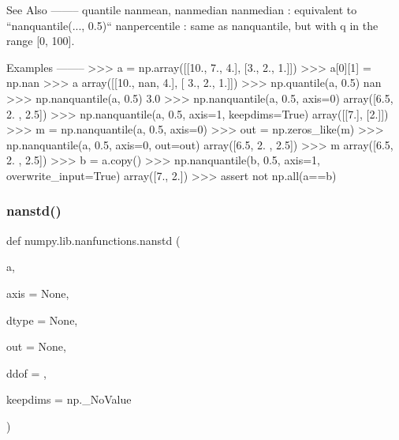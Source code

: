 \begin{DoxyVerb}
See Also
--------
quantile
nanmean, nanmedian
nanmedian : equivalent to ``nanquantile(..., 0.5)``
nanpercentile : same as nanquantile, but with q in the range [0, 100].

Examples
--------
>>> a = np.array([[10., 7., 4.], [3., 2., 1.]])
>>> a[0][1] = np.nan
>>> a
array([[10.,  nan,   4.],
      [ 3.,   2.,   1.]])
>>> np.quantile(a, 0.5)
nan
>>> np.nanquantile(a, 0.5)
3.0
>>> np.nanquantile(a, 0.5, axis=0)
array([6.5, 2. , 2.5])
>>> np.nanquantile(a, 0.5, axis=1, keepdims=True)
array([[7.],
       [2.]])
>>> m = np.nanquantile(a, 0.5, axis=0)
>>> out = np.zeros_like(m)
>>> np.nanquantile(a, 0.5, axis=0, out=out)
array([6.5, 2. , 2.5])
>>> m
array([6.5,  2. ,  2.5])
>>> b = a.copy()
>>> np.nanquantile(b, 0.5, axis=1, overwrite_input=True)
array([7., 2.])
>>> assert not np.all(a==b)
\end{DoxyVerb}
 \mbox{\label{namespacenumpy_1_1lib_1_1nanfunctions_acb96436d04b671c696d194e3feb1317d}} 
\subsubsection{\texorpdfstring{nanstd()}{nanstd()}}
{\footnotesize\ttfamily def numpy.\+lib.\+nanfunctions.\+nanstd (\begin{DoxyParamCaption}\item[{}]{a,  }\item[{}]{axis = {\ttfamily None},  }\item[{}]{dtype = {\ttfamily None},  }\item[{}]{out = {\ttfamily None},  }\item[{}]{ddof = {},  }\item[{}]{keepdims = {\ttfamily np.\+\_\+NoValue} }\end{DoxyParamCaption})}

